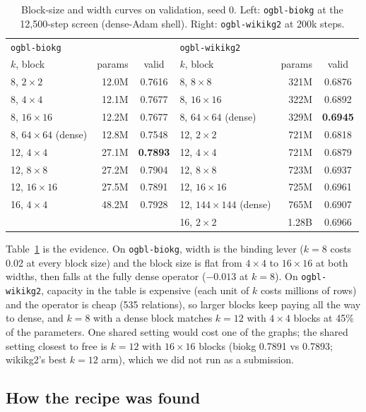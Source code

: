 \documentclass[11pt,a4paper]{article}
\begin{document}
\begin{table}[t]
\centering
\caption{Block-size and width curves on validation, seed 0. Left:
\texttt{ogbl-biokg} at the 12{,}500-step screen (dense-Adam shell).
Right: \texttt{ogbl-wikikg2} at 200k steps.}
\label{tab:curves}
\small
\begin{tabular}{lrc@{\hskip 1.5cm}lrc}
\toprule
\multicolumn{3}{l}{\texttt{ogbl-biokg}} & \multicolumn{3}{l}{\texttt{ogbl-wikikg2}} \\
$k$, block & params & valid & $k$, block & params & valid \\
\midrule
8, $2\times2$ & 12.0M & 0.7616 & 8, $8\times8$ & 321M & 0.6876 \\
8, $4\times4$ & 12.1M & 0.7677 & 8, $16\times16$ & 322M & 0.6892 \\
8, $16\times16$ & 12.2M & 0.7677 & 8, $64\times64$ (dense) & 329M & \textbf{0.6945} \\
8, $64\times64$ (dense) & 12.8M & 0.7548 & 12, $2\times2$ & 721M & 0.6818 \\
12, $4\times4$ & 27.1M & \textbf{0.7893} & 12, $4\times4$ & 721M & 0.6879 \\
12, $8\times8$ & 27.2M & 0.7904 & 12, $8\times8$ & 723M & 0.6937 \\
12, $16\times16$ & 27.5M & 0.7891 & 12, $16\times16$ & 725M & 0.6961 \\
16, $4\times4$ & 48.2M & 0.7928 & 12, $144\times144$ (dense) & 765M & 0.6907 \\
 & & & 16, $2\times2$ & 1.28B & 0.6966 \\
\bottomrule
\end{tabular}
\end{table}

Table~\ref{tab:curves} is the evidence. On \texttt{ogbl-biokg}, width is
the binding lever ($k=8$ costs 0.02 at every block size) and the block
size is flat from $4\times4$ to $16\times16$ at both widths, then falls at
the fully dense operator ($-0.013$ at $k=8$). On \texttt{ogbl-wikikg2},
capacity in the table is expensive (each unit of $k$ costs millions of
rows) and the operator is cheap (535 relations), so larger blocks keep
paying all the way to dense, and $k=8$ with a dense block matches $k=12$
with $4\times4$ blocks at 45\% of the parameters. One shared setting
would cost one of the graphs; the shared setting closest to free is
$k=12$ with $16\times16$ blocks (biokg 0.7891 vs 0.7893; wikikg2's best
$k=12$ arm), which we did not run as a submission.

\subsection{How the recipe was found}
\label{sec:recipe}
\end{document}
